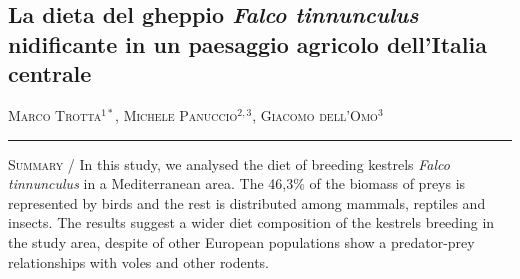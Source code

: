 \setcounter{figure}{0}
\setcounter{table}{0}

\begin{adjustwidth}{-3.5cm}{0cm}
\pagestyle{CIOpage}
\chapter*[La dieta del gheppio in un paesaggio agricolo
dell'Italia centrale]{La dieta del gheppio \textbf{\textit{Falco
tinnunculus}}\textbf{ nidificante in un paesaggio agricolo
dell'Italia centrale}}

\textsc{Marco Trotta}$^{1*}$, \textsc{Michele Panuccio}$^{2,3}$, \textsc{Giacomo
dell{\textquoteright}Omo}$^{3}$ \\

  
\noindent\color{MUSEBLUE}\rule{27cm}{2pt}
\vspace{1cm}
\end{adjustwidth}


{
\small
\noindent \textsc{\color{MUSEBLUE} Summary} / In this study, we analysed the diet of breeding kestrels \textit{Falco tinnunculus} in a Mediterranean area. The 46,3\% of the biomass of
preys is represented by birds and the rest is distributed among
mammals, reptiles and insects. The results suggest a wider diet
composition of the kestrels breeding in the study area, despite of
other European populations show a predator-prey relationships with
voles and other rodents. \\
}
\vspace{1cm}

